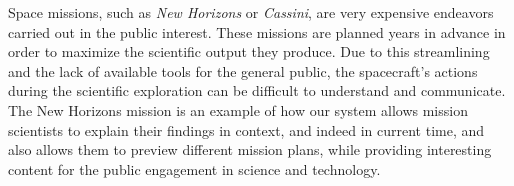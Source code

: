 \documentclass[journal]{vgtc}                %
\newcommand{\anderscomment}[1]{\textbf{[-Anders-~}
    \textcolor{cyan}{#1}
    \textbf{~]}}
\newcommand{\fig}[1]{Figure~\ref{fig:#1}}
\begin{document}



Space missions, such as \emph{New Horizons} or \emph{Cassini}, are very expensive endeavors carried out in the public interest. These missions are planned years in advance in order to maximize the scientific output they produce. Due to this streamlining and the lack of available tools for the general public, the spacecraft's actions during the scientific exploration can be difficult to understand and communicate. The New Horizons mission is an example of how our system allows mission scientists to explain their findings in context, and indeed in current time, and also allows them to preview different mission plans, while providing interesting content for the public engagement in science and technology.
\end{document}
